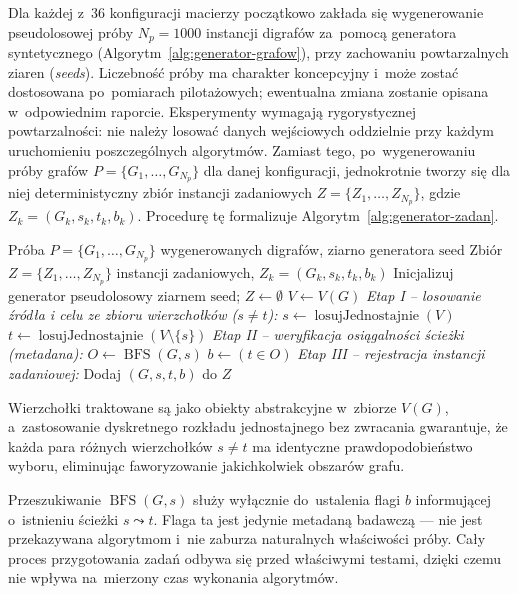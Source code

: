 \documentclass[11pt,a4paper,oneside]{report}
\begin{document}
Dla każdej z~36 konfiguracji macierzy początkowo zakłada się wygenerowanie pseudolosowej próby $N_p = 1000$ instancji digrafów za~pomocą generatora syntetycznego (Algorytm~\ref{alg:generator-grafow}), przy zachowaniu powtarzalnych ziaren (\textit{seeds}). Liczebność próby ma charakter koncepcyjny i~może zostać dostosowana po~pomiarach pilotażowych; ewentualna zmiana zostanie opisana w~odpowiednim raporcie. Eksperymenty wymagają rygorystycznej powtarzalności: nie należy losować danych wejściowych oddzielnie przy każdym uruchomieniu poszczególnych algorytmów. Zamiast tego, po~wygenerowaniu próby grafów $P = \{G_1, \ldots, G_{N_p}\}$ dla danej konfiguracji, jednokrotnie tworzy się dla niej deterministyczny zbiór instancji zadaniowych $Z = \{Z_1, \ldots, Z_{N_p}\}$, gdzie $Z_k = (G_k, s_k, t_k, b_k)$. Procedurę tę formalizuje Algorytm~\ref{alg:generator-zadan}.

\begin{algorithm}[H]
  \caption{Generowanie danych zadaniowych dla próby grafów}
  \label{alg:generator-zadan}
  \small
  \begin{algorithmic}[1]
    \Require Próba $P = \{G_1, \ldots, G_{N_p}\}$ wygenerowanych digrafów, ziarno generatora $\text{seed}$
    \Ensure Zbiór $Z = \{Z_1, \ldots, Z_{N_p}\}$ instancji zadaniowych, $Z_k = (G_k, s_k, t_k, b_k)$
    \State Inicjalizuj generator pseudolosowy ziarnem $\text{seed}$; $Z \gets \emptyset$
      \State $V \gets V(G)$
      \Statex \textit{\quad Etap I -- losowanie źródła i celu ze zbioru wierzchołków ($s \neq t$):}
      \State $s \gets \operatorname{losujJednostajnie}(V)$
      \State $t \gets \operatorname{losujJednostajnie}(V \setminus \{s\})$
      \Statex \textit{\quad Etap II -- weryfikacja osiągalności ścieżki (metadana):}
      \State $O \gets \operatorname{BFS}(G, s)$
      \State $b \gets (t \in O)$
      \Statex \textit{\quad Etap III -- rejestracja instancji zadaniowej:}
      \State Dodaj $(G, s, t, b)$ do $Z$
    \EndFor
    \State {}
  \end{algorithmic}
\end{algorithm}

Wierzchołki traktowane są jako obiekty abstrakcyjne w~zbiorze $V(G)$, a~zastosowanie dyskretnego rozkładu jednostajnego bez zwracania gwarantuje, że każda para różnych wierzchołków $s \neq t$ ma identyczne prawdopodobieństwo wyboru, eliminując faworyzowanie jakichkolwiek obszarów grafu.

Przeszukiwanie $\operatorname{BFS}(G, s)$ służy wyłącznie do~ustalenia flagi $b$ informującej o~istnieniu ścieżki $s \leadsto t$. Flaga ta jest jedynie metadaną badawczą — nie jest przekazywana algorytmom i~nie zaburza naturalnych właściwości próby. Cały proces przygotowania zadań odbywa się przed właściwymi testami, dzięki czemu nie wpływa na~mierzony czas wykonania algorytmów.
\end{document}
